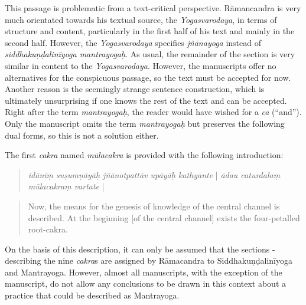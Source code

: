 This passage is problematic from a text-critical perspective. Rāmancandra is very much orientated towards his textual source, the \textit{Yogasvarodaya}, in terms of structure and content, particularly in the first half of his text and mainly in the second half. However, the \textit{Yogasvarodaya} specifies \textit{jñānayoga} instead of \textit{siddhakuṇḍalinīyoga mantrayogaḥ}. As usual, the remainder of the section is very similar in content to the \textit{Yogasvarodaya}. However, the manuscripts offer no alternatives for the conspicuous passage, so the text must be accepted for now. Another reason is the seemingly strange sentence construction, which is ultimately unsurprising if one knows the rest of the text and can be accepted. Right after the term \textit{mantrayogaḥ}, the reader would have wished for a \textit{ca} (``and''). Only the manuscript  omits the term \textit{mantrayogaḥ} but preserves the following dual forms, so this is not a solution either.    

The first \textit{cakra} named \textit{mūlacakra} is provided with the following introduction:

\begin{quote}
  \textit{idānīṃ suṣumṇāyāḥ jñānotpattāv upāyāḥ kathyante} | \textit{ādau caturdalaṃ mūlacakraṃ vartate} | 
\end{quote}
\begin{quote}
  Now, the means for the genesis of knowledge of the central channel is described. At the beginning [of the central channel] exists the four-petalled root-cakra.
  \end{quote}

  On the basis of this description, it can only be assumed that the sections - describing the nine \textit{cakra}s are assigned by Rāmacandra to Siddhakuṇḍalinīyoga and Mantrayoga. However, almost all manuscripts, with the exception of the  manuscript, do not allow any conclusions to be drawn in this context about a practice that could be described as Mantrayoga.

